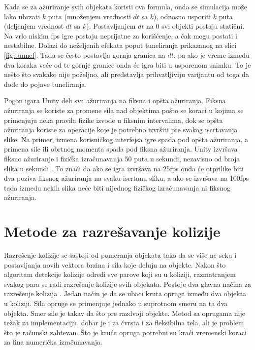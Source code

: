 \documentclass[12pt,oneside]{memoir}
\begin{document}
Kada se za ažuriranje svih objekata koristi ova formula, onda se simulacija može lako ubrzati $k$ puta
(množenjem vrednosti $dt$ sa $k$), odnosno usporiti $k$ puta (deljenjem vrednost $dt$ sa $k$).
Postavljanjem $dt$ na 0 svi objekti postaju statični. 
Na vrlo niskim fps igre postaju neprijatne za korišćenje, a čak mogu postati i nestabilne.
Dolazi do neželjenih efekata poput tuneliranja prikazanog na slici \ref{fig:tunnel}.
Tada se često postavlja gornja granica na $dt$, pa 
ako je vreme između dva koraka veće od te gornje granice onda će igra biti u usporenom snimku.
To je nešto što svakako nije poželjno, ali predstavlja prihvatljiviju varijantu od toga da dođe do pojave tuneliranja.

Pogon igara Unity deli sva ažuriranja na fiksna i opšta ažuriranja. 
Fiksna ažuriranja se koriste za promene sila nad objektima 
pošto se koraci u kojima se primenjuju neka pravila fizike izvode u fiksnim intervalima, 
dok se opšta ažuriranja koriste za operacije koje je potrebno izvršiti pre svakog iscrtavanja slike. 
Na primer, izmena korisničkog interfejsa igre spada pod opšta ažuriranja, a primena sile ili obrtnog momenta spada pod fiksna ažuriranja.
Unity izvršava fiksno ažuriranje i fizička izračunavanja 50 puta u sekundi, nezavisno od broja slika u sekundi \cite{unity}.
To znači da ako se igra izvršava na 25fps onda će otprilike biti dva poziva fiksnog ažuriranja na svaku iscrtanu sliku,
a ako se izvršava na 100fps tada između nekih slika neće biti nijednog fizičkog izračunavanja ni fiksnog ažuriranja.

\section{Metode za razrešavanje kolizije}
\label{sec:razresenje}

Razrešenje kolizije se sastoji od
pomeranja objekata tako da se više ne seku i postavljanja novih vektora brzina i sila koje deluju na objekte.
Nakon što algoritam detekcije kolizije odredi sve parove koji su u koliziji, 
razmatranjem svakog para se radi razrešenje kolizije svih objekata.
Postoje dva glavna načina za razrešenje kolizija \cite{Moore}.
Jedan način je da se ubaci kruta opruga između dva objekta u koliziji.
Sila opruge se primenjuje jednako u suprotnom smeru na ta dva objekta.
Smer sile je takav da što pre razdvoji objekte. Metod sa oprugama nije težak 
za implementaciju, dobar je i za čvrsta i za fleksibilna tela, ali je problem što je računski zahtevan. 
Što je kruća opruga potrebni su kraći vremenski koraci za fina numerička izračunavanja.
\end{document}
